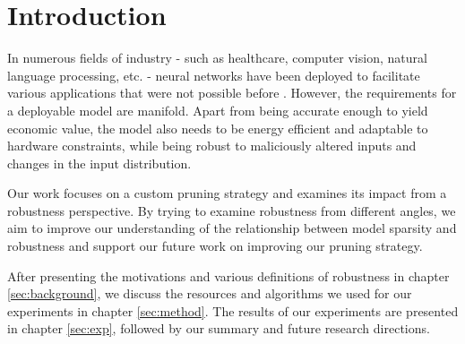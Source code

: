 \section*{Introduction}

In numerous fields of industry - such as healthcare, computer vision, natural language processing, etc. - neural networks have been deployed
to facilitate various applications that were not possible before \cite{effnet}. However, the requirements for a deployable model are
manifold. Apart from being accurate enough to yield economic value, the model also needs to be energy efficient and adaptable
to hardware constraints, while being robust to maliciously altered inputs and changes in the input distribution. 

Our work focuses on a custom pruning strategy and examines its impact from a robustness perspective. By trying to examine robustness from different
angles, we aim to improve our understanding of the relationship between model sparsity and robustness and support our future work on
improving our pruning strategy.  

After presenting the motivations and various definitions of robustness in chapter \ref{sec:background}, we discuss the resources and algorithms we
used for our experiments in chapter \ref{sec:method}. The results of our experiments are presented in chapter \ref{sec:exp}, followed by
our summary and future research directions.